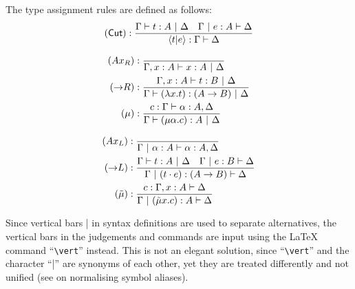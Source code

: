 \begin{definition}
    The type assignment rules are defined as follows:
    {
        \derivationfont
        \[
            (\textsf{Cut}): \frac{\Gamma \vdash t: A \ |\  \Delta \quad \Gamma \ |\  e: A \vdash \Delta}{\langle t|e \rangle: \Gamma \vdash \Delta}
        \]
    }%
    \vspace{-26pt}
    \begin{center}
        \derivationfont
        \begin{minipage}{.4\textwidth}
            \begingroup
            \addtolength{\jot}{1em}
            \begin{align*}
                (Ax_R)&: \frac{}{\Gamma, x: A \vdash x: A \ |\  \Delta} \\
                (\mathord{\to} R)&: \frac{\Gamma, x: A \vdash t: B \ |\  \Delta}{\Gamma \vdash (\lambda x. t): (A \to B) \ |\  \Delta} \\
                (\mu)&: \frac{c: \Gamma \vdash \alpha: A, \Delta}{\Gamma \vdash (\mu \alpha. c): A \ |\  \Delta}
            \end{align*}
            \endgroup
        \end{minipage}%
        \begin{minipage}{.4\textwidth}
            \begingroup
            \addtolength{\jot}{1em}
            \begin{align*}
                (Ax_L)&: \frac{}{\Gamma \ |\  \alpha: A \vdash \alpha: A, \Delta} \\
                (\mathord{\to} L)&: \frac{\Gamma \vdash t: A \ |\  \Delta \quad \Gamma \ |\  e: B \vdash \Delta}{\Gamma \ |\  (t \cdot e): (A \to B) \vdash \Delta} \\
                (\tilde{\mu})&: \frac{c: \Gamma, x: A \vdash \Delta}{\Gamma \ |\  (\tilde{\mu}x. c): A \vdash \Delta}
            \end{align*}
            \endgroup
        \end{minipage}
    \end{center}
\end{definition}
Since vertical bars | in syntax definitions are used to separate alternatives, the vertical bars in the judgements and commands are input using the \LaTeX{} command ``\lstinline{\vert}'' instead. This is not an elegant solution, since ``\lstinline{\vert}'' and the character ``|'' are synonyms of each other, yet they are treated differently and not unified (see  on normalising symbol aliases).

